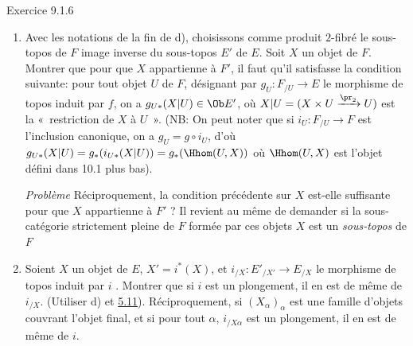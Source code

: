 \documentclass[10pt]{../fichiers-configuration-latex/smfart}
\begin{document}
\begin{enonce*}[remark]{Exercice 9.1.6}
\begin{enumerate}
\item Avec les notations de la fin de d), choisissons comme produit
$2$-fibré le sous-topos de $F$ image inverse du sous-topos $E'$ de
$E$. Soit $X$ un objet de $F$. Montrer que pour que $X$ appartienne
à $F'$, il faut qu'il satisfasse la condition suivante: pour tout
objet $U$ de $F$, désignant par $g_U:F_{/U}\rightarrow E$ le
morphisme de topos induit par $f$, on a $g_{U\ast}(X| U)\in \Ob E'$,
où $X| U=(X\times U\xrightarrow{\pr_2}U)$ est la « restriction de
$X$ à $U$ ». (NB: On peut noter que si $i_U:F_{/U}\rightarrow F$
est l'inclusion canonique, on a $g_U=g\circ i_U$, d'où $g_{U\ast}(X|
U)=g_{\ast}(i_{U\ast}(X| U))=g_{\ast}(\Hhom(U,X))$ où $\Hhom(U,X)$
est l'objet défini dans 10.1 plus bas).

\noindent \emph{Problème} Réciproquement, la condition précédente
sur $X$ est-elle suffisante pour que $X$ appartienne à $F'$ ? Il
revient au même de demander si la sous-catégorie strictement pleine
de $F$ formée par ces objets $X$ est un \emph{sous-topos} de $F$

\item Soient $X$ un objet de $E$, $X'=i^{\ast}(X)$, et
$i_{/X}:E'_{/X'}\rightarrow E_{/X}$ le morphisme de topos induit par
$i$ . Montrer que si $i$ est un plongement, il en est
de même de $i_{/X}$. (Utiliser d) et \hyperref[IV.prop5.11]{5.11}).
Réciproquement, si $(X_{\alpha})_{\alpha}$ est une famille d'objets
couvrant l'objet final, et si pour tout $\alpha$, $i_{/X\alpha}$ est
un plongement, il en est de même de $i$.
\end{enumerate}
\end{enonce*}
\end{document}
